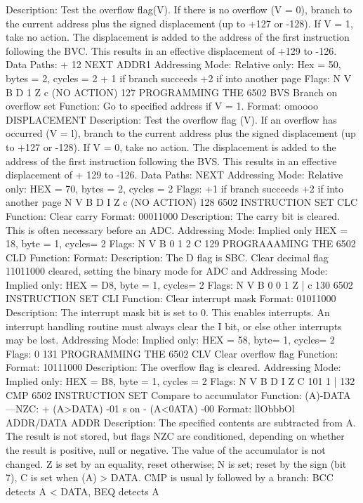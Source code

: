 \documentclass{book}
\begin{document}
Description:
Test the overflow flag(V). If there is no overflow (V = 0), branch
to the current address plus the signed displacement (up to +127
or -128). If V = 1, take no action.
The displacement is added to the address of the first instruction
following the BVC. This results in an effective displacement of
+129 to -126.
Data Paths:
+ 12
NEXT ADDR1
Addressing Mode:
Relative only:
Hex = 50, bytes = 2, cycles = 2 + 1 if branch succeeds
+2 if into another page
Flags:
N V B D 1 Z c
(NO ACTION)
127
PROGRAMMING THE 6502
BVS Branch on overflow set
Function:
Go to specified address if V = 1.
Format: omoooo DISPLACEMENT
Description:
Test the overflow flag (V). If an overflow has occurred (V = l),
branch to the current address plus the signed displacement (up to
+127 or -128). If V = 0, take no action.
The displacement is added to the address of the first instruction
following the BVS. This results in an effective displacement of
+ 129 to -126.
Data Paths:
NEXT
Addressing Mode:
Relative only:
HEX = 70, bytes = 2, cycles = 2
Flags:
+1 if branch succeeds
+2 if into another page
N V B D I Z c
(NO ACTION)
128
6502 INSTRUCTION SET
CLC
Function:
Clear carry
Format: 00011000
Description:
The carry bit is cleared. This is often necessary before an ADC.
Addressing Mode:
Implied only
HEX = 18, byte = 1, cycles= 2
Flags:
N V B 0 1 2 C
129
PROGRAAAMING THE 6502
CLD
Function:
Format:
Description:
The D flag is
SBC.
Clear decimal flag
11011000
cleared, setting the binary mode for ADC and
Addressing Mode:
Implied only:
HEX = D8, byte = 1, cycles= 2
Flags:
N V B 0
0
1 Z
|
c
130
6502 INSTRUCTION SET
CLI
Function:
Clear interrupt mask
Format: 01011000
Description:
The interrupt mask bit is set to 0. This enables interrupts. An
interrupt handling routine must always clear the I bit, or else
other interrupts may be lost.
Addressing Mode:
Implied only:
HEX = 58, byte= 1, cycles= 2
Flags:
0
131
PROGRAMMING THE 6502
CLV Clear overflow flag
Function:
Format:
10111000
Description:
The overflow flag is cleared.
Addressing Mode:
Implied only:
HEX = B8, byte = 1, cycles = 2
Flags:
N V B D I Z C
101 1 |
132
CMP
6502 INSTRUCTION SET
Compare to accumulator
Function:
(A)-DATA—NZC:
+ (A>DATA)
-01
s
on
- (A<0ATA)
-00
Format: llObbbOl ADDR/DATA ADDR
Description:
The specified contents are subtracted from A. The result is not
stored, but flags NZC are conditioned, depending on whether the
result is positive, null or negative. The value of the accumulator
is not changed. Z is set by an equality, reset otherwise; N is set;
reset by the sign (bit 7), C is set when (A) > DATA. CMP is usual
ly followed by a branch: BCC detects A < DATA, BEQ detects A
\end{document}
